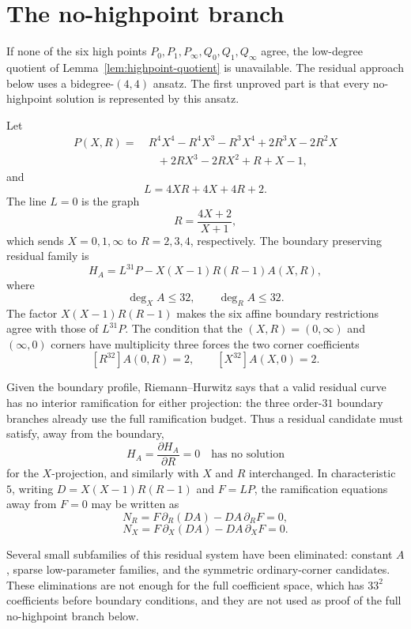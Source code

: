 \documentclass[11pt]{amsart}
\begin{document}
\section{The no-highpoint branch}
\label{sec:no-highpoint}

If none of the six high points \(P_0,P_1,P_\infty,Q_0,Q_1,Q_\infty\) agree,
the low-degree quotient of Lemma~\ref{lem:highpoint-quotient} is unavailable.
The residual approach below uses a bidegree-\((4,4)\) ansatz.  The first
unproved part is that every no-highpoint solution is represented by this
ansatz.

Let
\[
\begin{aligned}
P(X,R)=&\ R^4X^4-R^4X^3-R^3X^4
       +2R^3X-2R^2X\\
      &\quad +2RX^3-2RX^2+R+X-1,
\end{aligned}
\]
and
\[
  L=4XR+4X+4R+2.
\]
The line \(L=0\) is the graph
\[
  R=\frac{4X+2}{X+1},
\]
which sends \(X=0,1,\infty\) to \(R=2,3,4\), respectively.  The boundary
preserving residual family is
\[
  H_A=L^{31}P-X(X-1)R(R-1)A(X,R),
\]
where
\[
  \deg_X A\le 32,\qquad \deg_R A\le 32.
\]
The factor \(X(X-1)R(R-1)\) makes the six affine boundary restrictions agree
with those of \(L^{31}P\).  The condition that the
\((X,R)=(0,\infty)\) and \((\infty,0)\) corners have multiplicity three
forces the two corner coefficients
\[
  [R^{32}]A(0,R)=2,\qquad [X^{32}]A(X,0)=2.
\]

Given the boundary profile, Riemann--Hurwitz says that a valid residual curve
has no interior ramification for either projection: the three order-\(31\)
boundary branches already use the full ramification budget.  Thus a residual
candidate must satisfy, away from the boundary,
\[
  H_A=\frac{\partial H_A}{\partial R}=0
  \quad\text{has no solution}
\]
for the \(X\)-projection, and similarly with \(X\) and \(R\) interchanged.
In characteristic \(5\), writing \(D=X(X-1)R(R-1)\) and \(F=LP\), the
ramification equations away from \(F=0\) may be written as
\[
  N_R=F\,\partial_R(DA)-DA\,\partial_RF=0,
\]
\[
  N_X=F\,\partial_X(DA)-DA\,\partial_XF=0.
\]

Several small subfamilies of this residual system have been eliminated:
constant \(A\), sparse low-parameter families, and the symmetric
ordinary-corner candidates.  These eliminations are not enough for the full
coefficient space, which has \(33^2\) coefficients before boundary conditions,
and they are not used as proof of the full no-highpoint branch below.
\end{document}
